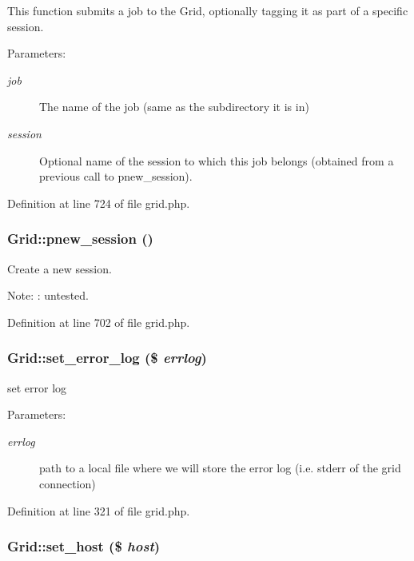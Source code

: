This function submits a job to the Grid, optionally tagging it as part of a specific session.

\begin{Desc}
\item[Parameters:]
\begin{description}
\item[{\em job}]The name of the job (same as the subdirectory it is in) \item[{\em session}]Optional name of the session to which this job belongs (obtained from a previous call to pnew\_\-session). \end{description}
\end{Desc}


Definition at line 724 of file grid.php.
\subsubsection{\setlength{\rightskip}{0pt plus 5cm}Grid::pnew\_\-session ()}\label{classGrid_a13}


Create a new session. 

\begin{Desc}
\item[Note:]: untested. \end{Desc}


Definition at line 702 of file grid.php.
\subsubsection{\setlength{\rightskip}{0pt plus 5cm}Grid::set\_\-error\_\-log (\$ {\em errlog})}\label{classGrid_a6}


set error log 

\begin{Desc}
\item[Parameters:]
\begin{description}
\item[{\em errlog}]path to a local file where we will store the error log (i.e. stderr of the grid connection) \end{description}
\end{Desc}


Definition at line 321 of file grid.php.
\subsubsection{\setlength{\rightskip}{0pt plus 5cm}Grid::set\_\-host (\$ {\em host})}\label{classGrid_a2}


